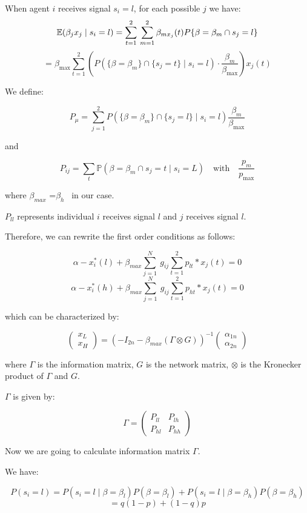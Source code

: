 \documentclass[12pt]{article}
\begin{document}
When agent $i$ receives signal $s_i =l$, for each possible $j$ we have:
\[
\mathbb{E}(\beta_j x_j \mid s_i = l) = \sum_{t=1}^{2} \\
\sum_{m=1}^{2} \beta_{mx_j}(t) P\{\beta = \beta_m \cap s_j = l\}
\]
\[
= \beta_{\max} \sum_{t=1}^{2} \left( P\left( \{\beta = \beta_m\} \cap \{s_j = t\} \mid s_i = l \right) \cdot \frac{\beta_m}{\beta_{\max}} \right)x_j(t)
\]



We define:

\[
P_{\mu} = \sum_{j=1}^{2}P(\{\beta = \beta_m\} \cap\{ s_j = l\} \mid s_i = l)\frac{\beta_m}{\beta_{\max}}
\]

and

\[
P_{ij} = \sum_{t} \mathbb{P}(\beta = \beta_m \cap s_j = t \mid s_i = L)
\quad \text{with} \quad \frac{p_m}{p_{\max}}
\]

where $\beta_{max}$ =$\beta_h$ \  in our case.

$P_{ll}$ represents individual $i$ receives signal $l$ and $j$ receives signal $l$.

Therefore, we can rewrite the first order conditions as follows:

\[
\alpha - x_i ^*(l)+ \beta_{max}  \sum_{j=1}^{N}\ g_{ij} \sum_{t=1}^{2}p_{lt}*x_j(t)=0
\]
\[
\alpha - x_i ^*(h)+ \beta_{max}  \sum_{j=1}^{N}\ g_{ij} \sum_{t=1}^{2}p_{ht}*x_j(t)=0
\]

which can be characterized by:

\[
\begin{pmatrix}
x_L \\
x_H
\end{pmatrix}
= \left( -I_{2n} - \beta_{max} (\Gamma\otimes G) \right)^{-1}
\begin{pmatrix}
\alpha_{1n} \\
\alpha_{2n}
\end{pmatrix}
\]

where $\Gamma$ is the information matrix, $G$ is the network matrix, $\otimes$ is the Kronecker product of $\Gamma$ and $G$.

$\Gamma$ is given by:

\[
\Gamma = 
\begin{pmatrix}
P_{ll} & P_{lh} \\
P_{hl} & P_{hh}
\end{pmatrix}
\]

Now we are going to calculate information matrix $\Gamma$.

We have:

\[
P(s_i = l) = P(s_i = l \mid \beta = \beta_l)P(\beta = \beta_l) + P(s_i = l \mid \beta = \beta_h) P(\beta = \beta_h)
\]
\[
=q(1-p)+(1-q)p
\]
\end{document}
